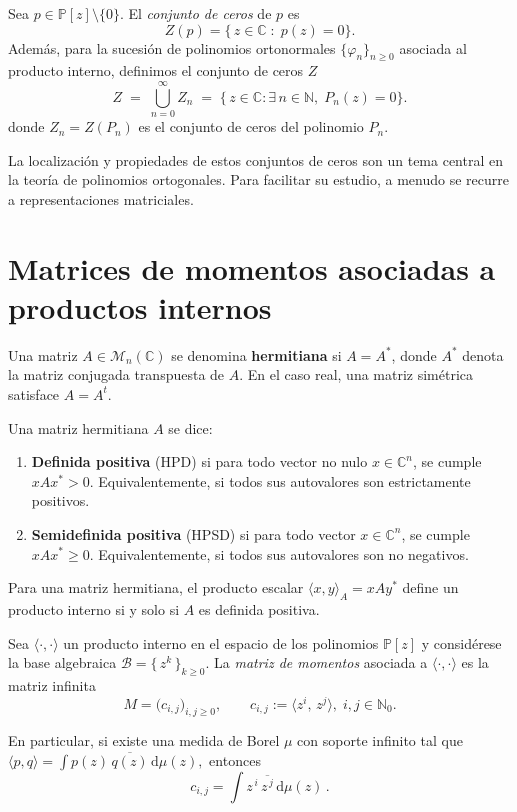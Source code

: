 \begin{definition}\label{def:ceros}
	Sea $p\in\mathbb{P}[z]\setminus\{0\}$.
	El \emph{conjunto de ceros} de $p$ es
	\[
		Z(p)=\bigl\{\,z\in\mathbb{C}\;:\;p(z)=0\bigr\}.
	\]
	Además, para la sucesión de polinomios ortonormales \(\{\varphi_n\}_{n\ge0}\) asociada al producto interno, definimos el conjunto de ceros $Z$
	\[
		Z \;=\; \bigcup_{n=0}^{\infty} Z_n
		\;=\;\bigl\{\,z\in\mathbb{C} : \exists\,n\in\mathbb{N},\;P_n(z)=0\bigr\}.
	\]
	donde $Z_n = Z(P_n)$ es el conjunto de ceros del polinomio $P_n$.
\end{definition}

La localización y propiedades de estos conjuntos de ceros son un tema central en la teoría de polinomios ortogonales. Para facilitar su estudio, a menudo se recurre a representaciones matriciales.

\section{Matrices de momentos asociadas a productos internos}

\begin{definition}\label{def:hermitian_matrix}
	\cite{Horn_Johnson_2012} Una matriz $A \in \mathcal{M}_{n}(\mathbb{C})$ se denomina \textbf{hermitiana} si $A = A^*$, donde $A^*$ denota la matriz conjugada transpuesta de $A$. En el caso real, una matriz simétrica satisface $A = A^t$.

	Una matriz hermitiana $A$ se dice:
	\begin{enumerate}
		\item \textbf{Definida positiva} (HPD) si para todo vector no nulo $x \in \mathbb{C}^n$, se cumple $xAx^* > 0$. Equivalentemente, si todos sus autovalores son estrictamente positivos.

		\item \textbf{Semidefinida positiva} (HPSD) si para todo vector $x \in \mathbb{C}^n$, se cumple $xAx^* \geq 0$. Equivalentemente, si todos sus autovalores son no negativos.
	\end{enumerate}

	Para una matriz hermitiana, el producto escalar $\langle x, y \rangle_A = xAy^*$ define un producto interno si y solo si $A$ es definida positiva.
\end{definition}

\begin{definition}\label{def:moment_matrix}
	Sea \(\langle\!\cdot,\cdot\!\rangle\) un producto interno en el espacio de los polinomios
	\(\mathbb{P}[z]\) y considérese la base algebraica
	\(\mathcal{B}=\{\,z^{k}\,\}_{k\ge 0}\).
	La \emph{matriz de momentos} asociada a \(\langle\!\cdot,\cdot\!\rangle\) es la matriz
	infinita
	\[
		M=\bigl(c_{i,j}\bigr)_{i,j\ge 0},
		\qquad
		c_{i,j}:=\bigl\langle z^{i},\,z^{j}\bigr\rangle ,\; i,j\in\mathbb N_{0}.
	\]

	En particular, si existe una medida de Borel \(\mu\) con soporte infinito tal que
	\(
	\langle p,q\rangle=\displaystyle\int p(z)\,\overline{q(z)}\,\mathrm d\mu(z),
	\)
	entonces
	\[
		c_{i,j}=\int z^{\,i}\,\overline{z^{\,j}}\,\mathrm d\mu(z)\, .
	\]%
\end{definition}

